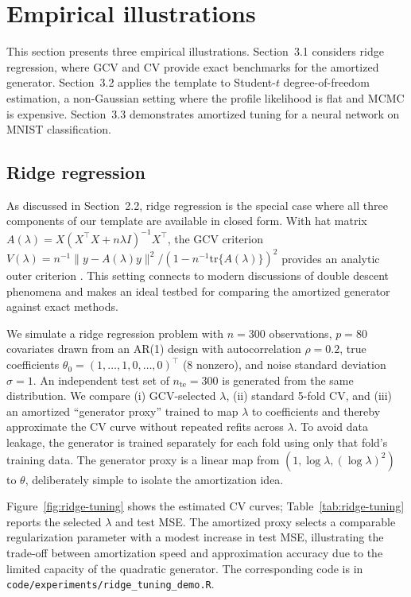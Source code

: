 \documentclass[12pt]{article}
\begin{document}
\section{Empirical illustrations}

This section presents three empirical illustrations. Section~3.1 considers ridge regression, where GCV and CV provide exact benchmarks for the amortized generator. Section~3.2 applies the template to Student-$t$ degree-of-freedom estimation, a non-Gaussian setting where the profile likelihood is flat and MCMC is expensive. Section~3.3 demonstrates amortized tuning for a neural network on MNIST classification.

\subsection{Ridge regression}

As discussed in Section~2.2, ridge regression is the special case where all three components of our template are available in closed form. With hat matrix $A(\lambda) = X(X^\top X + n\lambda I)^{-1}X^\top$, the GCV criterion $V(\lambda) = n^{-1}\|y - A(\lambda)y\|^2 / (1 - n^{-1}\mathrm{tr}\{A(\lambda)\})^2$ provides an analytic outer criterion \citep{golub1979generalized}. This setting connects to modern discussions of double descent phenomena \citep{belkin2019reconciling,polson2025bayesian} and makes an ideal testbed for comparing the amortized generator against exact methods.

We simulate a ridge regression problem with $n=300$ observations, $p=80$ covariates drawn from an AR(1) design with autocorrelation $\rho=0.2$, true coefficients $\theta_0=(1,\ldots,1,0,\ldots,0)^\top$ (8 nonzero), and noise standard deviation $\sigma=1$. An independent test set of $n_{\mathrm{te}}=300$ is generated from the same distribution. We compare (i) GCV-selected $\lambda$, (ii) standard 5-fold CV, and (iii) an amortized ``generator proxy'' trained to map $\lambda$ to coefficients and thereby approximate the CV curve without repeated refits across $\lambda$. To avoid data leakage, the generator is trained separately for each fold using only that fold's training data. The generator proxy is a linear map from $(1,\log\lambda, (\log\lambda)^2)$ to $\theta$, deliberately simple to isolate the amortization idea.

Figure~\ref{fig:ridge-tuning} shows the estimated CV curves; Table~\ref{tab:ridge-tuning} reports the selected $\lambda$ and test MSE. The amortized proxy selects a comparable regularization parameter with a modest increase in test MSE, illustrating the trade-off between amortization speed and approximation accuracy due to the limited capacity of the quadratic generator. The corresponding code is in \texttt{code/experiments/ridge\_tuning\_demo.R}.
\end{document}
